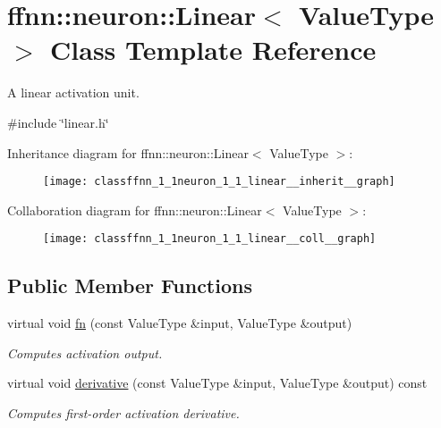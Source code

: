 \hypertarget{classffnn_1_1neuron_1_1_linear}{\section{ffnn\-:\-:neuron\-:\-:Linear$<$ Value\-Type $>$ Class Template Reference}
\label{classffnn_1_1neuron_1_1_linear}
}


A linear activation unit.  




{\ttfamily \#include \char`\"{}linear.\-h\char`\"{}}



Inheritance diagram for ffnn\-:\-:neuron\-:\-:Linear$<$ Value\-Type $>$\-:\nopagebreak
\begin{figure}[H]
\begin{center}
\leavevmode
\texttt{[image: classffnn\_1\_1neuron\_1\_1\_linear\_\_inherit\_\_graph]}
\end{center}
\end{figure}


Collaboration diagram for ffnn\-:\-:neuron\-:\-:Linear$<$ Value\-Type $>$\-:\nopagebreak
\begin{figure}[H]
\begin{center}
\leavevmode
\texttt{[image: classffnn\_1\_1neuron\_1\_1\_linear\_\_coll\_\_graph]}
\end{center}
\end{figure}
\subsection*{Public Member Functions}
\begin{DoxyCompactItemize}
\item 
virtual void \hyperlink{classffnn_1_1neuron_1_1_linear_a4d92b666c3e0a81865be7d09c0c4016e}{fn} (const Value\-Type \&input, Value\-Type \&output)
\begin{DoxyCompactList}\small\item\em Computes activation output. \end{DoxyCompactList}\item 
virtual void \hyperlink{classffnn_1_1neuron_1_1_linear_a4656398d6a4c1bda77d25adbad148ae9}{derivative} (const Value\-Type \&input, Value\-Type \&output) const 
\begin{DoxyCompactList}\small\item\em Computes first-\/order activation derivative. \end{DoxyCompactList}\end{DoxyCompactItemize}


